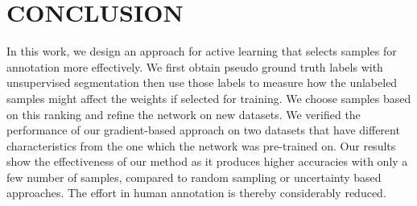 \documentclass[letterpaper, 10 pt, conference]{ieeeconf}  %
\begin{document}
\section{CONCLUSION}
\label{sec:conclusion}
In this work, we design an approach for active learning that selects samples for annotation more effectively. We first obtain pseudo ground truth labels with unsupervised segmentation then use those labels to measure how the unlabeled samples might affect the weights if selected for training. We choose samples based on this ranking and refine the network on new datasets.
We verified the performance of our gradient-based approach on two datasets that have different characteristics from the one which the network was pre-trained on. Our results show the effectiveness of our method as it produces higher accuracies with only a few number of samples, compared to random sampling or uncertainty based approaches. The effort in human annotation is thereby considerably reduced.
 




\end{document}
